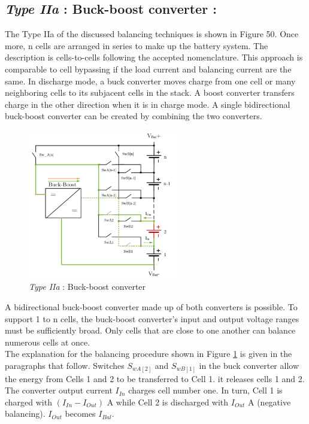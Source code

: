\subsection{\textit{Type IIa} :  Buck-boost converter :}
The Type IIa of the discussed balancing techniques is shown in Figure 50. Once more, n cells are arranged in series to make up the battery system. The description is cells-to-cells following the accepted nomenclature. This approach is comparable to cell bypassing if the load current and balancing current are the same. In discharge mode, a buck converter moves charge from one cell or many neighboring cells to its subjacent cells in the stack. A boost converter transfers charge in the other direction when it is in charge mode. A single bidirectional buck-boost converter can be created by combining the two converters.
\begin{figure}[h]
	\centering
	\includegraphics[width=0.6\textwidth]{Chap04/Figures/Type2a_ABMS.PNG}
	\caption{\textit{Type IIa} :  Buck-boost converter }
	\label{fig:Type2a Buck-boost converter}
\end{figure}
A bidirectional buck-boost converter made up of both converters is possible. To support 1 to n cells, the buck-boost converter's input and output voltage ranges must be sufficiently broad. Only cells that are close to one another can balance numerous cells at once. 
\\
\indent The explanation for the balancing procedure shown in Figure \ref{fig:Type2a Buck-boost converter} is given in the paragraphs that follow. Switches $S_{wA[2]}$ and $S_{wB[1]}$ in the buck converter allow the energy from Cells 1 and 2 to be transferred to Cell 1. 
it releases cells 1 and 2. The converter output current $I_{In}$ charges cell number one. In turn, Cell 1 is charged with $(I_{In} - I_{Out})$ A while Cell 2 is discharged with $I_{Out}$ A (negative balancing). $I_{Out}$ becomes $I_{Bal}$. 
